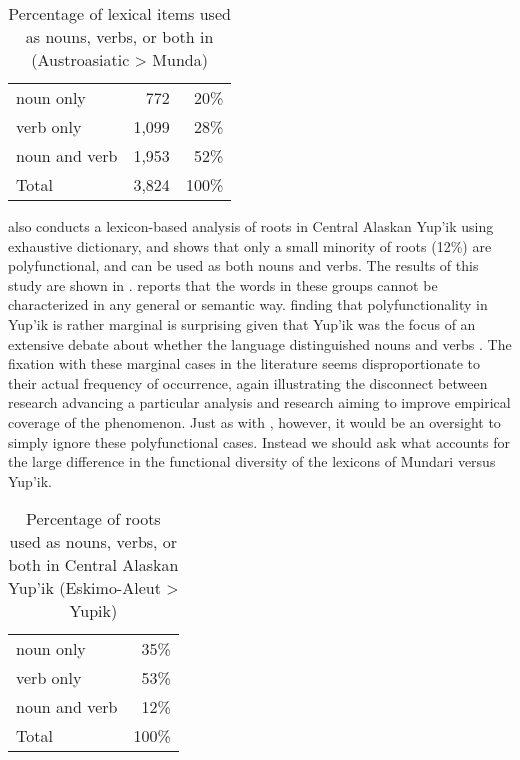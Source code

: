 \begin{table}[h]
  \centering
  \caption[Percentage of lexical items used as nouns, verbs, or both in Mundari (Austroasiatic > Munda)]{Percentage of lexical items used as nouns, verbs, or both in  (Austroasiatic > Munda) \parencite[383]{EvansOsada2005}}
  \label{tab:Evans-Osada-2005}
  \begin{tabular}{ l r r }
    \toprule
    noun only     &   772 &  20\% \\
    verb only     & 1,099 &  28\% \\
    noun and verb & 1,953 &  52\% \\
    \midrule
    Total         & 3,824 & 100\% \\
    \bottomrule
  \end{tabular}
\end{table}

\textcite[163]{Mithun2017} also conducts a lexicon-based analysis of roots in Central Alaskan Yup'ik using  exhaustive dictionary, and shows that only a small minority of roots (12\%) are polyfunctional, and can be used as both nouns and verbs. The results of this study are shown in . \citeauthor{Mithun2017} reports that the words in these groups cannot be characterized in any general or semantic way.  finding that polyfunctionality in Yup'ik is rather marginal is surprising given that Yup'ik was the focus of an extensive debate about whether the language distinguished nouns and verbs \parencite{Sadock1999}. The fixation with these marginal cases in the literature seems disproportionate to their actual frequency of occurrence, again illustrating the disconnect between research advancing a particular analysis and research aiming to improve empirical coverage of the phenomenon. Just as with , however, it would be an oversight to simply ignore these polyfunctional cases. Instead we should ask what accounts for the large difference in the functional diversity of the lexicons of Mundari versus Yup'ik.

\begin{table}[h]
  \centering
  \caption[Percentage of roots used as nouns, verbs, or both in Central Alaskan Yup'ik (Eskimo-Aleut > Yupik)]{Percentage of roots used as nouns, verbs, or both in Central Alaskan Yup'ik (Eskimo-Aleut > Yupik) \parencite[163]{Mithun2017}}
  \label{tab:Mithun-2017}
  \begin{tabular}{ l r }
    \toprule
    noun only     &  35\% \\
    verb only     &  53\% \\
    noun and verb &  12\% \\
    \midrule
    Total         & 100\% \\
    \bottomrule
  \end{tabular}
\end{table}


